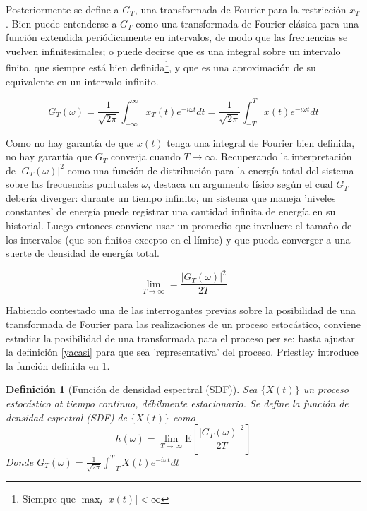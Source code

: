 \documentclass[12pt,a4paper]{mitthesis}
\newtheorem{defn}{Definici\'on}
\newcommand{\intR}{\int_{-\infty}^{\infty}}
\newcommand{\E}[1]{\mathrm{E}\left[ #1 \right]}
\newcommand{\abso}[1]{\left| #1 \right|}
\begin{document}
Posteriormente se define a $G_T$, una transformada de Fourier para la restricci\'on $x_T$. Bien 
puede entenderse a $G_T$ como una transformada de Fourier cl\'asica para una funci\'on extendida 
peri\'odicamente en intervalos, de modo que las frecuencias se vuelven infinitesimales; o puede 
decirse que es una integral sobre un intervalo finito, que siempre est\'a bien 
definida\footnote{Siempre que $\max_t \abso{x(t)} < \infty$}, y que es una aproximaci\'on de su 
equivalente en un intervalo infinito.

\begin{equation*}
G_T (\omega) = \frac{1}{\sqrt{2 \pi}} \intR x_T(t) e^{-i \omega t} dt
= \frac{1}{\sqrt{2 \pi}} \int_{-T}^{T} x(t) e^{-i \omega t} dt
\end{equation*}

Como no hay garant\'ia de que $x(t)$ tenga una integral de Fourier bien definida, no hay garant\'ia 
que $G_T$ converja cuando $T\rightarrow \infty$. Recuperando la interpretaci\'on de 
$\left| G_T(\omega) \right|^{2}$ como una funci\'on de distribuci\'on para la energ\'ia total del 
sistema sobre las frecuencias puntuales $\omega$, destaca un argumento f\'isico seg\'un el cual 
$G_T$ {deber\'ia} diverger: durante un tiempo infinito, un sistema que maneja 'niveles constantes' 
de energ\'ia puede registrar una cantidad infinita de energ\'ia en su historial. 
Luego entonces conviene usar un promedio que involucre el tama\~no de los intervalos (que son 
finitos excepto en el l\'imite) y que pueda converger a una suerte de densidad de energ\'ia total.

\begin{equation}
\lim_{T\rightarrow{\infty}} = \frac{ \left| G_T(\omega) \right|^{2}}{2 T}
\label{yacasi}
\end{equation}

Habiendo contestado una de las interrogantes previas sobre la posibilidad de una transformada de 
Fourier para las realizaciones de un proceso estoc\'astico, conviene estudiar la posibilidad de una 
transformada para el proceso per se: basta ajustar la definici\'on \ref{yacasi} para que sea 
'representativa' del proceso. Priestley introduce la funci\'on definida en \ref{SDF}.

\begin{defn}[Funci\'on de densidad espectral (SDF)]
Sea $\{X(t)\}$ un proceso estoc\'astico at tiempo continuo, d\'ebilmente estacionario. Se define la 
funci\'on de densidad espectral (SDF) de $\{X(t)\}$ como
\begin{equation*}
h(\omega) = \lim_{T\rightarrow \infty} \E{ \frac{ \left| G_T(\omega) \right|^{2}}{2 T} }
\end{equation*}
Donde $G_T (\omega) = \frac{1}{\sqrt{2 \pi}} \int_{-T}^{T} X(t) e^{-i \omega t} dt$
\label{SDF}
\end{defn}
\end{document}
